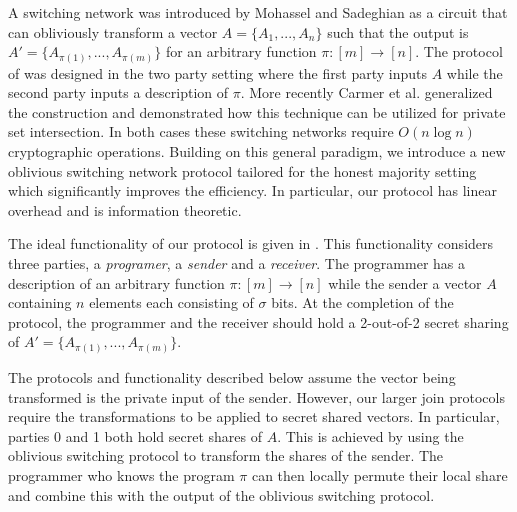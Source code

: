A switching network was introduced by Mohassel and Sadeghian\cite{MS13} as a circuit that can obliviously transform a vector $A=\{A_1,...,A_n\}$ such that the output is $A'=\{A_{\pi(1)}, ..., A_{\pi(m)}\}$ for an arbitrary function $\pi : [m]\rightarrow[n]$. The protocol of \cite{MS13} was designed in the two party setting where the first party inputs $A$ while the second party inputs a description of $\pi$. More recently Carmer et al. \cite{CMRS18} generalized the construction and demonstrated how this technique can be utilized for private set intersection. In both cases these switching networks require  $O(n\log n)$ cryptographic operations. Building on this general paradigm, we introduce a new oblivious switching network protocol tailored for the honest majority setting which significantly improves the efficiency. In particular, our protocol has linear overhead and is information theoretic. 

The ideal functionality of our protocol is given in . This functionality considers three parties, a \emph{programer}, a \emph{sender} and a \emph{receiver}. The programmer has a description of an arbitrary function  $\pi:[m]\rightarrow[n]$ while the sender a vector $A$ containing $n$ elements each consisting of $\sigma$ bits. At the completion of the protocol, the programmer and the receiver should hold a 2-out-of-2 secret sharing of $A'=\{A_{\pi(1)}, ..., A_{\pi(m)}\}$.


The protocols and functionality described below assume the vector being transformed is the private input of the sender. However, our larger join protocols require the transformations to be applied to secret shared vectors. In particular, parties 0 and 1 both hold secret shares of $A$. This is achieved by using the oblivious switching protocol to transform the shares of the sender. The programmer who knows the program $\pi$ can then locally permute their local share and combine this with the output of the oblivious switching protocol.

